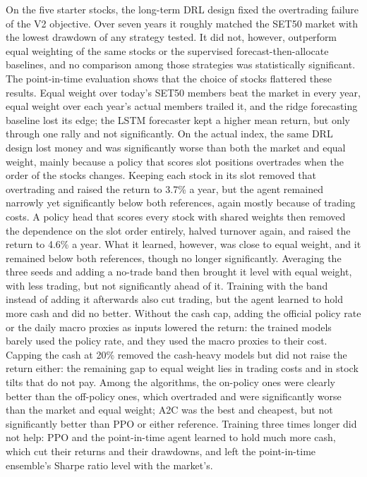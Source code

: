 On the five starter stocks, the long-term DRL design fixed the overtrading failure of the V2 objective.
Over seven years it roughly matched the SET50 market with the lowest drawdown of any strategy tested.
It did not, however, outperform equal weighting of the same stocks or the supervised
forecast-then-allocate baselines, and no comparison among those strategies was statistically
significant. The point-in-time evaluation shows that the choice of stocks flattered these results.
Equal weight over today's SET50 members beat the market in every year, equal weight over each year's
actual members trailed it, and the ridge forecasting baseline lost its edge; the LSTM forecaster kept a
higher mean return, but only through one rally and not significantly. On the actual index, the same
DRL design lost money and was significantly worse than both the market and equal weight, mainly
because a policy that scores slot positions overtrades when the order of the stocks changes. Keeping
each stock in its slot removed that overtrading and raised the return to 3.7\% a year, but the agent
remained narrowly yet significantly below both references, again mostly because of trading costs.
A policy head that scores every stock with shared weights then removed the dependence on the slot
order entirely, halved turnover again, and raised the return to 4.6\% a year. What it learned,
however, was close to equal weight, and it remained below both references, though no longer
significantly. Averaging the three seeds and adding a no-trade band then brought it level with equal
weight, with less trading, but not significantly ahead of it. Training with the band instead of adding
it afterwards also cut trading, but the agent learned to hold more cash and did no better. Without the cash cap, adding the
official policy rate or the daily macro proxies as inputs lowered the return: the trained models
barely used the policy rate, and they used the macro proxies to their cost. Capping the cash at 20\%
removed the cash-heavy models but did not raise the return either: the remaining gap to equal weight
lies in trading costs and in stock tilts that do not pay.
Among the algorithms, the on-policy ones were clearly better than the off-policy ones, which overtraded
and were significantly worse than the market and equal weight; A2C was the best and cheapest, but not
significantly better than PPO or either reference. Training three times longer did not help: PPO and the
point-in-time agent learned to hold much more cash, which cut their returns and their drawdowns, and left
the point-in-time ensemble's Sharpe ratio level with the market's.
